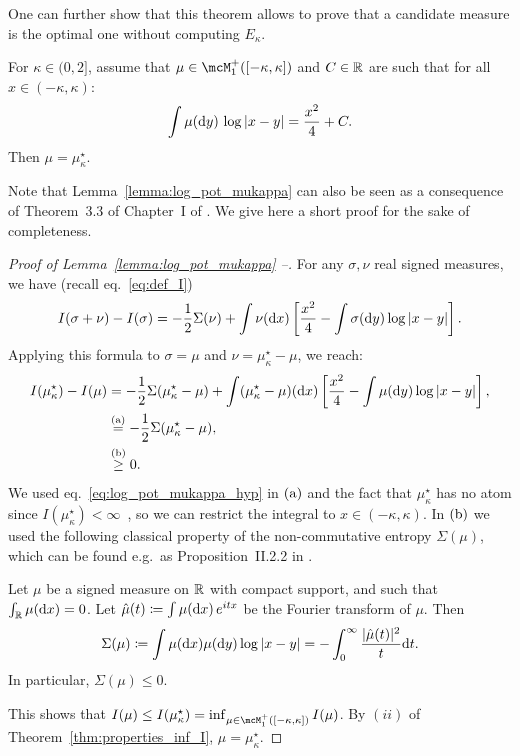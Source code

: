 \noindent
One can further show that this theorem allows to prove that a candidate measure is the optimal one without computing $E_\kappa$.
\begin{lemma}\label{lemma:log_pot_mukappa}
    For $\kappa \in (0,2]$, assume that $\mu \in \mcM_1^+([-\kappa,\kappa])$ and $C \in \mathbb{R}$ are such that for all $x \in (-\kappa,\kappa)$:
    \begin{equation}\label{eq:log_pot_mukappa_hyp}
        \int \mu(\mathrm{d} y) \, \log |x - y| = \frac{x^2}{4} + C.
    \end{equation}
    Then $\mu = \mu_\kappa^\star$.
\end{lemma}
\noindent
Note that Lemma~\ref{lemma:log_pot_mukappa} can also be seen as a consequence of Theorem~3.3 of Chapter~I of \cite{saff2013logarithmic}. 
We give here a short proof for the sake of completeness.
\begin{proof}[Proof of Lemma~\ref{lemma:log_pot_mukappa} --]
    For any $\sigma, \nu$ real signed measures, we have (recall eq.~\eqref{eq:def_I}) 
    \begin{equation*}
        I(\sigma + \nu) - I(\sigma) = -\frac{1}{2} \Sigma(\nu) + \int \nu(\mathrm{d} x) \left[\frac{x^2}{4} - \int \sigma(\mathrm{d} y) \log |x - y|\right]. 
    \end{equation*}
    Applying this formula to $\sigma = \mu$ and $\nu = \mu_\kappa^\star - \mu$, we reach:
    \begin{align*}
        I(\mu_\kappa^\star) - I(\mu) &= -\frac{1}{2} \Sigma(\mu_\kappa^\star - \mu) + \int (\mu_\kappa^\star - \mu)(\mathrm{d} x) \left[\frac{x^2}{4} - \int \mu(\mathrm{d} y) \log |x - y|\right], \\ 
         &\overset{\mathrm{(a)}}{=} -\frac{1}{2} \Sigma(\mu_\kappa^\star - \mu), \\ 
         &\overset{\mathrm{(b)}}{\geq} 0.
    \end{align*}
    We used eq.~\eqref{eq:log_pot_mukappa_hyp} in $(\rm a)$ and the fact that $\mu_\kappa^\star$ has no atom since $I(\mu_\kappa^\star) < \infty$~\citep{arous1997large}, so we can restrict the integral 
    to $x \in (-\kappa,\kappa)$.
    In $(\rm b)$ we used the following classical property of the non-commutative entropy $\Sigma(\mu)$, 
    which can be found e.g.\ as Proposition~II.2.2 in \cite{faraut2014logarithmic}.
    \begin{lemma}\label{lemma:nonc_entropy_pos}
        Let $\mu$ be a signed measure on $\mathbb{R}$ with compact support, and such that $\int_{\mathbb{R}} \mu(\mathrm{d} x) = 0$. 
        Let $\hat{\mu}(t) \coloneqq \int \mu(\mathrm{d} x) \, e^{i t x}$ be the Fourier transform of $\mu$.
        Then 
        \begin{equation*}
            \Sigma(\mu) \coloneqq \int \mu(\mathrm{d} x) \mu(\mathrm{d} y) \log |x - y| = - \int_0^\infty \frac{|\hat{\mu}(t)|^2}{t} \mathrm{d} t.
        \end{equation*}
        In particular, $\Sigma(\mu) \leq 0$.
    \end{lemma}
    \noindent
    This shows that $I(\mu) \leq I(\mu_\kappa^\star) = \inf_{\mu \in \mcM_1^+([-\kappa,\kappa])} I(\mu)$. By $(ii)$ of Theorem~\ref{thm:properties_inf_I}, $\mu = \mu_\kappa^\star$.
\end{proof}
